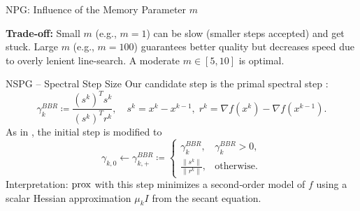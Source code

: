 \begin{frame}{NPG: Influence of the Memory Parameter $m$}
\centering
{}

\vspace{0.05cm}
\small
\textbf{Trade-off:} Small $m$ (e.g., $m=1$) can be slow (smaller steps accepted) and get stuck. Large $m$ (e.g., $m=100$) guarantees better quality but decreases speed due to overly lenient line-search. A moderate $m \in [5, 10]$ is optimal.
\end{frame}

\begin{frame}{NSPG – Spectral Step Size}
Our candidate step is the primal spectral step \cite{BB1,BB2}:
\begin{equation} \label{BBR}
\gamma_k^{BBR} \coloneqq \frac{(s^k)^T s^k}{(s^k)^T r^k},\quad
s^k = x^k - x^{k-1},\; r^k = \nabla f(x^k) - \nabla f(x^{k-1}).
\end{equation}
As in \cite{positiveBB}, the initial step is modified to
\[
\gamma_{k,0} \gets \gamma_{k,+}^{BBR} \coloneqq 
\begin{cases}
\gamma_k^{BBR}, & \gamma_k^{BBR} > 0,\\
\frac{\|s^k\|}{\|r^k\|}, & \text{otherwise}.
\end{cases}
\]
Interpretation: $\operatorname{prox}$ with this step minimizes a second‑order model of $f$ using a scalar Hessian approximation $\mu_k I$ from the secant equation.
\end{frame}

